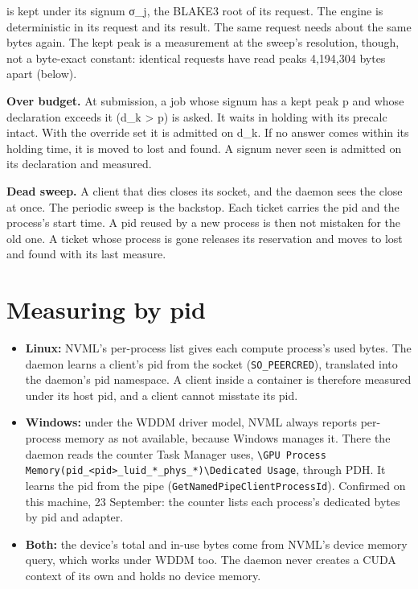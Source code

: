 is kept under its signum σ\_\allowbreak{}j, the BLAKE3 root of its request. The engine is deterministic in its request and its result. The same request needs about the same bytes again. The kept peak is a measurement at the sweep's resolution, though, not a byte-exact constant: identical requests have read peaks 4,194,304 bytes apart (below).

\textbf{Over budget.} At submission, a job whose signum has a kept peak p and whose declaration exceeds it (d\_\allowbreak{}k > p) is asked. It waits in holding with its precalc intact. With the override set it is admitted on d\_\allowbreak{}k. If no answer comes within its holding time, it is moved to lost and found. A signum never seen is admitted on its declaration and measured.

\textbf{Dead sweep.} A client that dies closes its socket, and the daemon sees the close at once. The periodic sweep is the backstop. Each ticket carries the pid and the process's start time. A pid reused by a new process is then not mistaken for the old one. A ticket whose process is gone releases its reservation and moves to lost and found with its last measure.

\section{\texorpdfstring{Measuring by pid}{Measuring by pid}}

\begin{itemize}
\item \textbf{Linux:} NVML's per-process list gives each compute process's used bytes. The daemon learns a client's pid from the socket (\texttt{SO\_\allowbreak{}PEERCRED}), translated into the daemon's pid namespace. A client inside a container is therefore measured under its host pid, and a client cannot misstate its pid.
\item \textbf{Windows:} under the WDDM driver model, NVML always reports per-process memory as not available, because Windows manages it. There the daemon reads the counter Task Manager uses, \texttt{\textbackslash{}GPU Process Memory(pid\_\allowbreak{}<pid>\_\allowbreak{}luid\_\allowbreak{}*\_\allowbreak{}phys\_\allowbreak{}*)\textbackslash{}Dedicated Usage}, through PDH. It learns the pid from the pipe (\texttt{Get\allowbreak{}Named\allowbreak{}Pipe\allowbreak{}Client\allowbreak{}Process\allowbreak{}Id}). Confirmed on this machine, 23 September: the counter lists each process's dedicated bytes by pid and adapter.
\item \textbf{Both:} the device's total and in-use bytes come from NVML's device memory query, which works under WDDM too. The daemon never creates a CUDA context of its own and holds no device memory.
\end{itemize}

